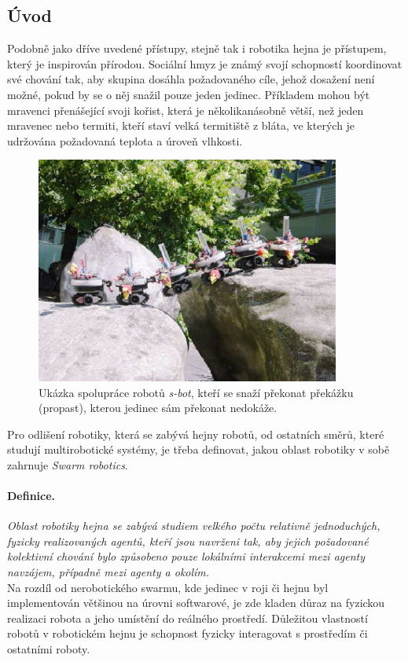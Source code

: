 \documentclass[a4paper,12pt]{article}
\begin{document}
\subsection{Úvod}
Podobně jako dříve uvedené přístupy, stejně tak i robotika hejna je přístupem, který
je inspirován přírodou. Sociální hmyz je známý svojí schopností koordinovat své
chování tak, aby skupina dosáhla požadovaného cíle, jehož dosažení není možné,
pokud by se o něj snažil pouze jeden jedinec. Příkladem mohou být mravenci
přenášející svoji kořist, která je několikanásobně větší, než jeden mravenec
nebo termiti, kteří staví velká termitiště z bláta, ve kterých je udržována
požadovaná teplota a úroveň vlhkosti.

\begin{figure}[here]
  \centering
  \includegraphics[width=10cm]{./img/sbot.png}
  \caption{Ukázka spolupráce robotů {\it s-bot}, kteří se snaží překonat překážku
    (propast), kterou jedinec sám překonat nedokáže.}
\end{figure}

Pro odlišení robotiky, která se zabývá hejny robotů, od ostatních směrů, které
studují multirobotické systémy, je třeba definovat, jakou oblast robotiky v sobě
zahrnuje {\it Swarm robotics}.

\paragraph{Definice.} {\it Oblast robotiky hejna se zabývá studiem
velkého počtu relativně jednoduchých, fyzicky realizovaných agentů, kteří jsou
navrženi tak, aby jejich požadované kolektivní chování bylo způsobeno pouze
lokálními interakcemi mezi agenty navzájem, případně mezi agenty a okolím.}
\cite{Sahin05}\\

Na rozdíl od nerobotického swarmu, kde jedinec v roji či hejnu byl implementován
většinou na úrovni softwarové, je zde kladen důraz na fyzickou realizaci robota
a jeho umístění do reálného prostředí. Důležitou vlastností robotů v robotickém
hejnu je schopnost fyzicky interagovat s prostředím či ostatními roboty.
\end{document}

